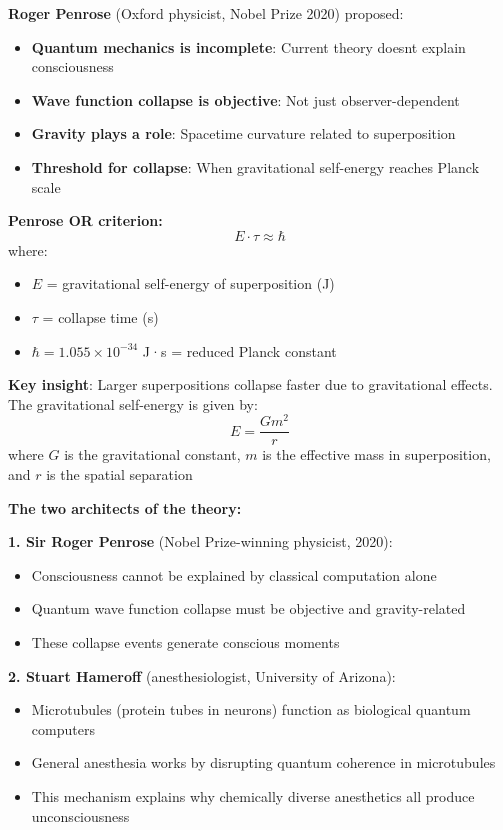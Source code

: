 \textbf{Roger Penrose} (Oxford physicist, Nobel Prize 2020) proposed:

\begin{itemize}
\tightlist
\item
  \textbf{Quantum mechanics is incomplete}: Current theory
  doesn\textquotesingle t explain consciousness
\item
  \textbf{Wave function collapse is objective}: Not just
  observer-dependent
\item
  \textbf{Gravity plays a role}: Spacetime curvature related to
  superposition
\item
  \textbf{Threshold for collapse}: When gravitational self-energy
  reaches Planck scale
\end{itemize}

\textbf{Penrose OR criterion:}
\begin{equation}
\label{eq:or-criterion}
E \cdot \tau \approx \hbar
\end{equation}
where:
\begin{itemize}
\item $E$ = gravitational self-energy of superposition (J)
\item $\tau$ = collapse time (s)
\item $\hbar = 1.055 \times 10^{-34}$ J·s = reduced Planck constant
\end{itemize}

\textbf{Key insight}: Larger superpositions collapse faster due to gravitational effects. The gravitational self-energy is given by:
\begin{equation}
\label{eq:grav-energy}
E = \frac{G m^2}{r}
\end{equation}
where $G$ is the gravitational constant, $m$ is the effective mass in superposition, and $r$ is the spatial separation

\textbf{The two architects of the theory:}

\textbf{1. Sir Roger Penrose} (Nobel Prize-winning physicist, 2020):
\begin{itemize}
\item Consciousness cannot be explained by classical computation alone
\item Quantum wave function collapse must be objective and gravity-related
\item These collapse events generate conscious moments
\end{itemize}

\textbf{2. Stuart Hameroff} (anesthesiologist, University of Arizona):
\begin{itemize}
\item Microtubules (protein tubes in neurons) function as biological quantum computers
\item General anesthesia works by disrupting quantum coherence in microtubules
\item This mechanism explains why chemically diverse anesthetics all produce unconsciousness
\end{itemize}

